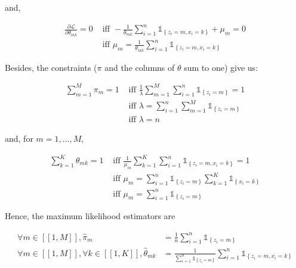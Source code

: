 \documentclass[a4paper, 11pt]{report}
\begin{document}
and,

\begin{equation*}
    \begin{aligned}
    \frac{\partial \mathcal{L}}{\partial \theta_{mk}} = 0 &\text{ iff } - \frac{1}{\theta_{mk}} \sum_{i=1}^{n} \mathds{1}_{\left\{ z_i = m, x_i = k \right\}} + \mu_{m} = 0 \\
    &\text{ iff } \mu_{m} = \frac{1}{\theta_{mk}} \sum_{i=1}^{n} \mathds{1}_{\left\{ z_i = m, x_i = k \right\}}
    \end{aligned}
\end{equation*}

Besides, the constraints ($\pi$ and the columns of $\theta$ sum to one) give us:

\begin{equation*}
    \begin{aligned}
    \sum_{m=1}^{M} \pi_{m} = 1 &\text{ iff } \frac{1}{\lambda} \sum_{m=1}^{M} \sum_{i=1}^{n} \mathds{1}_{\left\{ z_i = m \right\}} = 1 \\
    &\text{ iff } \lambda = \sum_{i=1}^{n} \sum_{m=1}^{M} \mathds{1}_{\left\{ z_i = m \right\}} \\
    &\text{ iff } \lambda = n
    \end{aligned}
\end{equation*}

and, for $m = 1, \dots, M$,

\begin{equation*}
    \begin{aligned}
    \sum_{k=1}^{K} \theta_{mk} = 1 &\text{ iff } \frac{1}{\mu_{m}} \sum_{k=1}^{K} \sum_{i=1}^{n} \mathds{1}_{\left\{ z_i = m, x_i = k \right\}} = 1 \\
    &\text{ iff } \mu_{m} = \sum_{i=1}^{n} \mathds{1}_{\left\{ z_i = m \right\}} \sum_{k=1}^{K} \mathds{1}_{\left\{ x_i = k \right\}} \\
    &\text{ iff } \mu_{m} = \sum_{i=1}^{n} \mathds{1}_{\left\{ z_i = m \right\}}
    \end{aligned}
\end{equation*}

Hence, the maximum likelihood estimators are 

\begin{equation*}
    \boxed{\begin{aligned}
    \forall m \in [\![ 1, M ]\!], \widehat{\pi}_m &= \frac{1}{n} \sum_{i=1}^{n} \mathds{1}_{\left\{ z_i = m \right\}} \\
    \forall m \in [\![ 1, M ]\!], \forall k \in [\![ 1, K ]\!], \widehat{\theta}_{mk} &= \frac{1}{\sum_{i=1}^{n} \mathds{1}_{\left\{ z_i = m \right\}}} \sum_{i=1}^{n} \mathds{1}_{\left\{ z_i = m, x_i = k \right\}} \end{aligned}}
\end{equation*}
\end{document}
